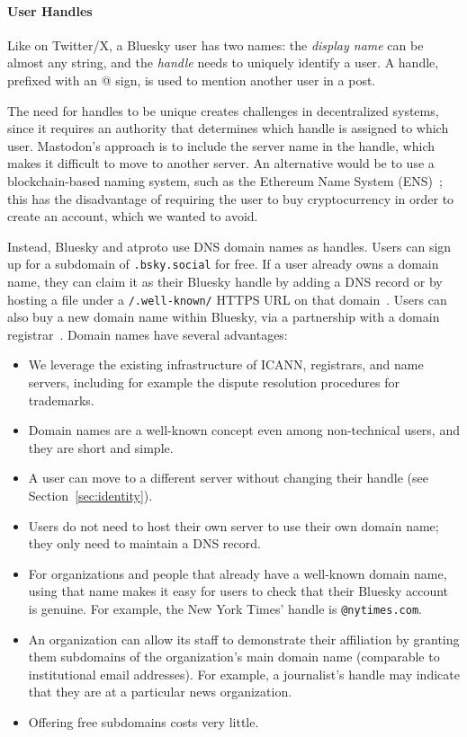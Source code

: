 \documentclass[sigconf]{acmart}
\begin{document}
\paragraph{User Handles}

Like on Twitter/X, a Bluesky user has two names: the \emph{display name} can be almost any string, and the \emph{handle} needs to uniquely identify a user.
A handle, prefixed with an @ sign, is used to mention another user in a post.

The need for handles to be unique creates challenges in decentralized systems, since it requires an authority that determines which handle is assigned to which user.
Mastodon's approach is to include the server name in the handle, which makes it difficult to move to another server.
An alternative would be to use a blockchain-based naming system, such as the Ethereum Name System (ENS)~\cite{ENS}; this has the disadvantage of requiring the user to buy cryptocurrency in order to create an account, which we wanted to avoid.

Instead, Bluesky and atproto use DNS domain names as handles.
Users can sign up for a subdomain of \texttt{.bsky.social} for free.
If a user already owns a domain name, they can claim it as their Bluesky handle by adding a DNS record or by hosting a file under a \texttt{/.well-known/} HTTPS URL on that domain~\cite{DomainHandle}.
Users can also buy a new domain name within Bluesky, via a partnership with a domain registrar~\cite{PurchaseDomain}.
Domain names have several advantages:
\begin{itemize}
    \item We leverage the existing infrastructure of ICANN, registrars, and name servers, including for example the dispute resolution procedures for trademarks.
    \item Domain names are a well-known concept even among non-technical users, and they are short and simple.
    \item A user can move to a different server without changing their handle (see Section~\ref{sec:identity}).
    \item Users do not need to host their own server to use their own domain name; they only need to maintain a DNS record.
    \item For organizations and people that already have a well-known domain name, using that name makes it easy for users to check that their Bluesky account is genuine. For example, the New York Times' handle is \texttt{@nytimes.com}.
    \item An organization can allow its staff to demonstrate their affiliation by granting them subdomains of the organization's main domain name (comparable to institutional email addresses). For example, a journalist's handle may indicate that they are at a particular news organization.
    \item Offering free subdomains costs very little.
\end{itemize}
\end{document}
